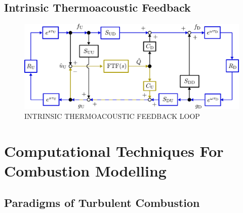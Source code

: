 






\subsection{Intrinsic Thermoacoustic Feedback}

\begin{figure}[t]
\centering
\includegraphics[scale=0.65]{assets/imgs/ITA-mech.pdf}
\caption{INTRINSIC THERMOACOUSTIC FEEDBACK LOOP}
\label{fig:ita-loop}
\end{figure}



\cite{emmert2015IntrinsicThermoacousticInstability}
\cite{silva2023IntrinsicThermoacousticInstabilities}
\cite{hoeijmakers2014IntrinsicInstabilityFlame}
\cite{hoeijmakers2016FlameDominatedThermoacoustic}
\cite{orchini2025TrackingAcousticIntrinsic}
\cite{chen2024BiglobalLinearStability}






\section{Computational Techniques For Combustion Modelling}

\subsection{Paradigms of Turbulent Combustion}

